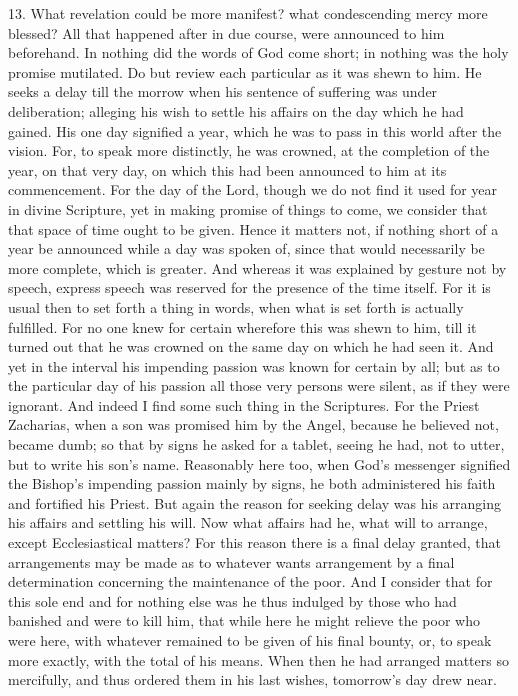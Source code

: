 13. What revelation could be
more manifest? what condescending mercy more blessed? All that
happened after in due course, were announced to him beforehand.
In nothing did the words of God come short; in nothing was the holy
promise mutilated. Do but review each particular as it was shewn to
him. He seeks a delay till the morrow when his sentence of suffering
was under deliberation; alleging his wish to settle his affairs on the
day which he had gained. His one day signified a year, which he was to
pass in this world after the vision. For, to speak more distinctly, he
was crowned, at the completion of the year, on that very day, on which
this had been announced to him at its commencement. For the day of the
Lord, though we do not find it used for year in divine Scripture, yet
in making promise of things to come, we consider that that space of
time ought to be given. Hence it matters not, if nothing short of a
year be announced while a day was spoken of, since that would
necessarily be more complete, which is greater. And whereas it was
explained by gesture not by speech, express speech was reserved for
the presence of the time itself. For it is usual then to set forth a
thing in words, when what is set forth is actually fulfilled. For no
one knew for certain wherefore this was shewn to him, till it turned
out that he was crowned on the same day on which he had seen it. And
yet in the interval his impending passion was known for certain by
all; but as to the particular day of his passion all those very
persons were silent, as if they were ignorant. And indeed I find some
such thing in the Scriptures. For the Priest Zacharias, when a son was
promised him by the Angel, because he believed not, became dumb; so
that by signs he asked for a tablet, seeing he had, not to utter, but
to write his son's name. Reasonably here too, when God's messenger
signified the Bishop's impending passion mainly by signs, he both
administered his faith and fortified his Priest. But again the reason
for seeking delay was his arranging his affairs and settling his will.
Now what affairs had he, what will to arrange, except Ecclesiastical
matters? For this reason there is a final delay granted, that
arrangements may be made as to whatever wants arrangement by a final
determination concerning the maintenance of the poor. And I consider
that for this sole end and for nothing else was he thus indulged by
those who had banished and were to kill him, that while here he
might relieve the poor who were here, with whatever remained to be
given of his final bounty, or, to speak more exactly, with the total
of his means. When then he had arranged matters so mercifully, and
thus ordered them in his last wishes, tomorrow's day drew near.

